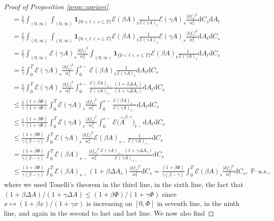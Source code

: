 \documentclass[10pt]{article} %
\newcommand\cE{\mathcal E}
\def \P{\mathbb{P}}
\def\d{\mathrm{d}}
\begin{document}
\begin{proof}[Proof of Proposition \ref{prop::apriori}]
\begin{align*}
	&= \frac{1}{\gamma}\int_{(0,\infty)}\int_{(0,\infty)}\mathbf{1}_{\{0<t < s \leq T\}} \cE(\beta A)_{t}  \frac{1}{\cE(\gamma A)_{t}} \cE(\gamma A)_s \frac{|\delta f_s|^2}{\alpha^2_s} \d C_s \d A_t \nonumber\\
	&= \frac{1}{\gamma}\int_{(0,\infty)}\int_{(0,\infty)}\mathbf{1}_{\{0<t < s \leq T\}} \cE(\beta A)_{t}  \frac{1}{\cE(\gamma A)_{t}} \cE(\gamma A)_s \frac{|\delta f_s|^2}{\alpha^2_s} \d A_t \d C_s \nonumber\\
	&= \frac{1}{\gamma}\int_{(0,\infty)} \cE(\gamma A)_s \frac{|\delta f_s|^2}{\alpha^2_s} \int_{(0,\infty)}\mathbf{1}_{\{0<t< s \leq T\}} \cE(\beta A)_{t}  \frac{1}{\cE(\gamma A)_{t}} \d A_t \d C_s \nonumber\\
	&= \frac{1}{\gamma}\int_0^T \cE(\gamma A)_s \frac{|\delta f_s|^2}{\alpha^2_s} \int_0^{s-} \cE(\beta A)_{t}  \frac{1}{\cE(\gamma A)_{t}} \d A_t \d C_s \\
	&=  \frac{1}{\gamma}\int_0^T \cE(\gamma A)_s \frac{|\delta f_s|^2}{\alpha^2_s} \int_0^{s-} \frac{\cE(\beta A)_{t-}}{\cE(\gamma A)_{t-}}\frac{(1+\beta\Delta A_t)}{(1+\gamma\Delta A_t)} \d A_t \d C_s \\
	&\leq  \frac{1}{\gamma}\frac{(1+\beta\Phi)}{(1+\gamma\Phi)} \int_0^T \cE(\gamma A)_s \frac{|\delta f_s|^2}{\alpha^2_s} \int_0^{s-} \frac{\cE(\beta A)_{t-}}{\cE(\gamma A)_{t-}}\d A_t \d C_s \\
	&\leq  \frac{1}{\gamma}\frac{(1+\beta\Phi)}{(1+\gamma\Phi)}\int_0^T \cE(\gamma A)_s \frac{|\delta f_s|^2}{\alpha^2_s} \int_0^{s-} \cE\big(\widehat A^{\beta,\gamma}\big)_{t-} \d A_t \d C_s \\
	&\leq \frac{(1+\beta\Phi)}{\gamma(\beta - \gamma)}\int_0^T \cE(\gamma A)_s \frac{|\delta f_s|^2}{\alpha^2_s}  \cE(\beta A)_{s-} \frac{1}{\cE(\gamma A)_{s-}} \d C_s \\
	&= \frac{(1+\beta\Phi)}{\gamma(\beta - \gamma)}\int_0^T \cE(\beta A)_{s-}  \frac{|\delta f_s|^2}{\alpha^2_s} \frac{\cE(\gamma A)_{s-}(1+\gamma\Delta A_s)}{\cE(\gamma A)_{s-}}  \d C_s \\
	&\leq \frac{(1+\beta\Phi)}{\gamma(\beta - \gamma)}\int_0^T \cE(\beta A)_{s-}(1+\beta\Delta A_s)  \frac{|\delta f_s|^2}{\alpha^2_s} \d C_s = \frac{(1+\beta\Phi)}{\gamma(\beta - \gamma)}\int_0^T \cE(\beta A)_s \frac{|\delta f_s|^2}{\alpha^2_s}   \d C_s, \; \text{$\P$--a.s.},
\end{align*}
where we used Tonelli's theorem in the third line,  in the sixth line, the fact that $(1+\beta \Delta A)/(1+\gamma \Delta A) \leq (1+\beta\Phi)/(1+\gamma\Phi)$ since $x \longmapsto (1+\beta x)/(1+\gamma x)$ is increasing on $[0,\Phi]$ in seventh line,  in the ninth line, and  again in the second to last and last line. We now also find

\end{proof}
\end{document}
